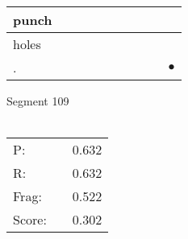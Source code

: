\documentclass[landscape]{article}
\newcommand{\ssp}{\hspace{2pt}}
\newcommand{\mex}{\cellcolor{g}$\bullet$}
\begin{document}
\begin{tabular}{|l|p{10pt}|p{10pt}|p{10pt}|p{10pt}|p{10pt}|p{10pt}|p{10pt}|p{10pt}|p{10pt}|}
\hline
\ssp punch \ssp&\hspace{2pt}&\hspace{2pt}&\hspace{2pt}&\hspace{2pt}&\hspace{2pt}&\hspace{2pt}&\hspace{2pt}&\hspace{2pt}&\hspace{2pt}\\
\hline
\ssp holes \ssp&\hspace{2pt}&\hspace{2pt}&\hspace{2pt}&\hspace{2pt}&\hspace{2pt}&\hspace{2pt}&\hspace{2pt}&\hspace{2pt}&\hspace{2pt}\\
\hline
\ssp \cellcolor{ref8}. \ssp&\hspace{2pt}&\hspace{2pt}&\hspace{2pt}&\hspace{2pt}&\hspace{2pt}&\hspace{2pt}&\hspace{2pt}&\hspace{2pt}&\hspace{2pt}\mex\\
\hline
\end{tabular}

\vspace{6pt}
\noindent Segment 109\\\\
\noindent\begin{tabular}{lm{12pt}r}
\hline
P:&&0.632\\
R:&&0.632\\
Frag:&&0.522\\
Score:&&0.302\\
\end{tabular}

\newpage
\end{document}
